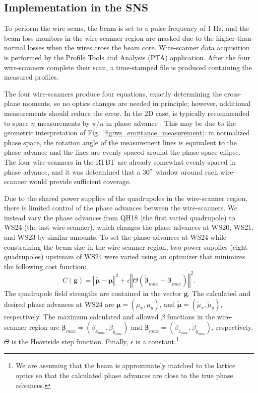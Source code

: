 \subsection{Implementation in the SNS}

To perform the wire scans, the beam is set to a pulse frequency of 1 Hz, and the beam loss monitors in the wire-scanner region are masked due to the higher-than-normal losses when the wires cross the beam core. Wire-scanner data acquisition is performed by the Profile Tools and Analysis (PTA) application. After the four wire-scanners complete their scan, a time-stamped file is produced containing the measured profiles.

The four wire-scanners produce four equations, exactly determining the cross-plane moments, so no optics changes are needed in principle; however, additional measurements should reduce the error. In the 2D case, is typically recommended to space $n$ measurements by $\pi / n$ in phase advance \cite{book:Minty2003}. This may be due to the geometric interpretation of Fig.~\ref{fig:ws_emittance_measurement}: in normalized phase space, the rotation angle of the measurement lines is equivalent to the phase advance and the lines are evenly spaced around the phase space ellipse. The four wire-scanners in the RTBT are already somewhat evenly spaced in phase advance, and it was determined that a 30$\degree$ window around each wire-scanner would provide sufficient coverage. 

Due to the shared power supplies of the quadrupoles in the wire-scanner region, there is limited control of the phase advances between the wire-scanners. We instead vary the phase advances from QH18 (the first varied quadrupole) to WS24 (the last wire-scanner), which changes the phase advances at WS20, WS21, and WS23 by similar amounts. To set the phase advances at WS24 while constraining the beam size in the wire-scanner region, two power supplies (eight quadrupoles) upstream of WS24 were varied using an optimizer that minimizes the following cost function:
%
\begin{equation}
    C(\mathbf{g}) = \left\Vert{\tilde{\bm{\mu}} - \bm{\mu} }\right\Vert^2
    + 
    \epsilon
    \left\Vert
    \Theta\left(
        \tilde{\bm{\beta}}_{max} - \bm{\beta}_{max}
    \right)
    \right\Vert^2
    .
\end{equation}
%
The quadrupole field strengths are contained in the vector $\mathbf{g}$. The calculated and desired phase advances at WS24 are $\bm{\mu} = (\mu_x, \mu_y)$, and $\tilde{\bm{\mu}} = (\tilde{\mu}_x, \tilde{\mu}_y)$, respectively. The maximum calculated and allowed $\beta$ functions in the wire-scanner region are $\bm{\beta}_{max} = (\beta_{x_{max}}, \beta_{y_{max}})$ and $\tilde{\bm{\beta}}_{max} = (\tilde{\beta}_{x_{max}}, \tilde{\beta}_{y_{max}})$, respectively. $\Theta$ is the Heaviside step function. Finally, $\epsilon$ is a constant.\footnote{We are assuming that the beam is approximately matched to the lattice optics so that the calculated phase advances are close to the true phase advances.}


